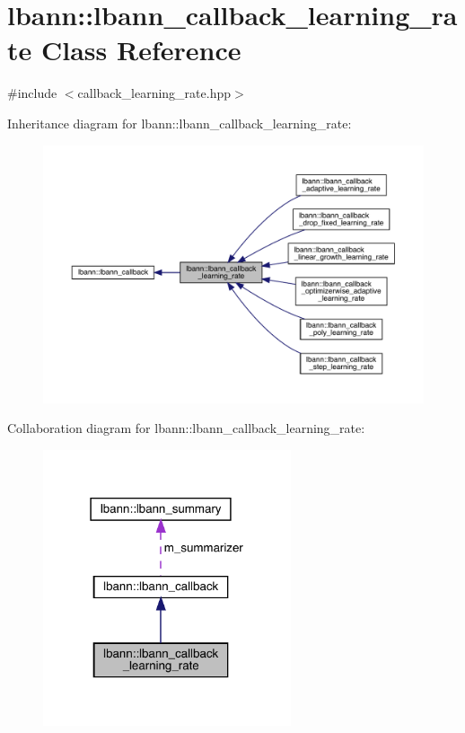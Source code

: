 \hypertarget{classlbann_1_1lbann__callback__learning__rate}{}\section{lbann\+:\+:lbann\+\_\+callback\+\_\+learning\+\_\+rate Class Reference}
\label{classlbann_1_1lbann__callback__learning__rate}


{\ttfamily \#include $<$callback\+\_\+learning\+\_\+rate.\+hpp$>$}



Inheritance diagram for lbann\+:\+:lbann\+\_\+callback\+\_\+learning\+\_\+rate\+:\nopagebreak
\begin{figure}[H]
\begin{center}
\leavevmode
\includegraphics[width=350pt]{classlbann_1_1lbann__callback__learning__rate__inherit__graph}
\end{center}
\end{figure}


Collaboration diagram for lbann\+:\+:lbann\+\_\+callback\+\_\+learning\+\_\+rate\+:\nopagebreak
\begin{figure}[H]
\begin{center}
\leavevmode
\includegraphics[width=207pt]{classlbann_1_1lbann__callback__learning__rate__coll__graph}
\end{center}
\end{figure}
